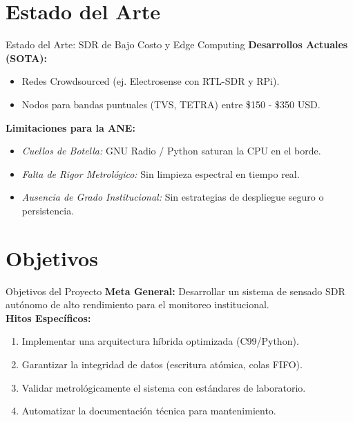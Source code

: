 \documentclass[aspectratio=169]{beamer}
\begin{document}
\section{Estado del Arte}
\begin{frame}{Estado del Arte: SDR de Bajo Costo y Edge Computing}
    \textbf{Desarrollos Actuales (SOTA):}
    \begin{itemize}
        \item Redes Crowdsourced (ej. Electrosense con RTL-SDR y RPi).
        \item Nodos para bandas puntuales (TVS, TETRA) entre \$150 - \$350 USD.
    \end{itemize}
    \vspace{0.3cm}
    \textbf{Limitaciones para la ANE:}
    \begin{itemize}
        \item \textit{Cuellos de Botella:} GNU Radio / Python saturan la CPU en el borde.
        \item \textit{Falta de Rigor Metrológico:} Sin limpieza espectral en tiempo real.
        \item \textit{Ausencia de Grado Institucional:} Sin estrategias de despliegue seguro o persistencia.
    \end{itemize}
\end{frame}

\section{Objetivos}
\begin{frame}{Objetivos del Proyecto}
    \textbf{Meta General:} Desarrollar un sistema de sensado SDR autónomo de alto rendimiento para el monitoreo institucional. \\
    \vspace{0.3cm}
    \textbf{Hitos Específicos:}
    \begin{enumerate}
        \item Implementar una arquitectura híbrida optimizada (C99/Python).
        \item Garantizar la integridad de datos (escritura atómica, colas FIFO).
        \item Validar metrológicamente el sistema con estándares de laboratorio.
        \item Automatizar la documentación técnica para mantenimiento.
    \end{enumerate}
\end{frame}
\end{document}
